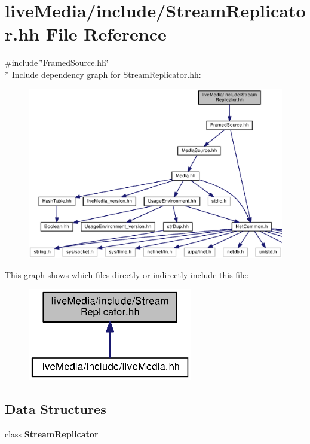 \section{live\+Media/include/\+Stream\+Replicator.hh File Reference}
\label{StreamReplicator_8hh}
{\ttfamily \#include \char`\"{}Framed\+Source.\+hh\char`\"{}}\\*
Include dependency graph for Stream\+Replicator.\+hh\+:
\nopagebreak
\begin{figure}[H]
\begin{center}
\leavevmode
\includegraphics[width=350pt]{StreamReplicator_8hh__incl}
\end{center}
\end{figure}
This graph shows which files directly or indirectly include this file\+:
\nopagebreak
\begin{figure}[H]
\begin{center}
\leavevmode
\includegraphics[width=204pt]{StreamReplicator_8hh__dep__incl}
\end{center}
\end{figure}
\subsection*{Data Structures}
\begin{DoxyCompactItemize}
\item 
class {\bf Stream\+Replicator}
\end{DoxyCompactItemize}
